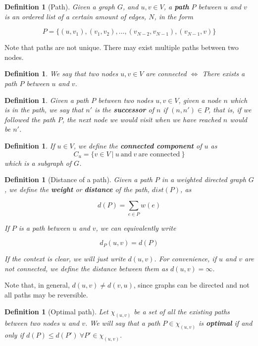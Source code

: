 \documentclass[a4paper,10pt]{report}
\newtheorem{definition}[theorem]{Definition}
\begin{document}
\begin{definition}[Path]
Given a graph $G$, and $u, v \in V$, a \textbf{path} $P$ between $u$ and $v$ is an ordered list of a certain amount of edges, $N$, in the form

\[ P = \{(u,v_1), (v_1, v_2), \dots, (v_{N-2}, v_{N-1}), (v_{N-1}, v)\} \]
\end{definition}

Note that paths are not unique. There may exist multiple paths between two nodes.

\begin{definition}
We say that two nodes $u, v \in V$ are connected $\Longleftrightarrow$ There exists a path $P$ between $u$ and $v$.
\end{definition}

\begin{definition}
Given a path $P$ between two nodes $u, v \in V$, given a node $n$ which is in the path, we say that $n'$ is the \textbf{successor} of $n$ if $(n, n') \in P$, that is, if we followed the path $P$, the next node we would visit when we have reached $n$ would be $n'$.
\end{definition}

\begin{definition}
If $u \in V$, we define the \textbf{connected component} of $u$ as
\[ C_u = \{ v \in V\ |\ u \ \text{and} \ v \ \text{are connected}\  \} \]
which is a subgraph of $G$.
\end{definition}

\begin{definition}[Distance of a path]
Given a path $P$ in a weighted directed graph $G$, we define the \textbf{weight} or \textbf{distance} of the path, $dist(P)$, as

\[ d(P) = \sum_{e \in P} w(e) \]

If $P$ is a path between $u$ and $v$, we can equivalently write

\[ d_P(u, v) = d(P) \]

If the context is clear, we will just write $d(u, v)$. For convenience, if $u$ and $v$ are not connected, we define the distance between them as $d(u, v) = \infty$.
\end{definition}

Note that, in general, $d(u, v) \neq d(v, u)$, since graphs can be directed and not all paths may be reversible.

\begin{definition}[Optimal path]
\label{def:optimal}
Let $\chi_{(u, v)}$ be a set of all the existing paths between two nodes $u$ and $v$. We will say that a path $P \in \chi_{(u,v)}$ is \textbf{optimal} if and only if $d(P) \le d(P') \ \forall P' \in \chi_{(u, v)}$.
\end{definition}
\end{document}
